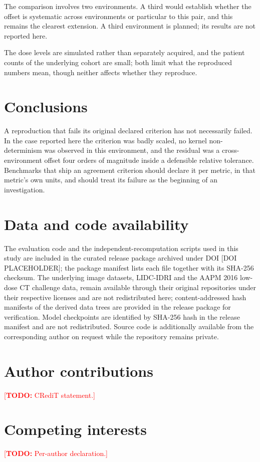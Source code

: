 \documentclass[11pt]{article}
\newcommand{\todo}[1]{\textcolor{red}{[\textbf{TODO:} #1]}}
\begin{document}
The comparison involves two environments. A third would establish whether the offset is systematic
across environments or particular to this pair, and this remains the clearest extension. A third
environment is planned; its results are not reported here.

The dose levels are simulated rather than separately acquired, and the patient counts of the
underlying cohort are small; both limit what the reproduced numbers mean, though neither affects
whether they reproduce.

\section{Conclusions}

A reproduction that fails its original declared criterion has not necessarily failed. In the case
reported here the criterion was badly scaled, no kernel non-determinism was observed in this
environment, and the residual was a cross-environment offset four orders of magnitude inside a
defensible relative tolerance. Benchmarks that ship an agreement criterion should declare it per metric, in that
metric's own units, and should treat its failure as the beginning of an investigation.

\section*{Data and code availability}
The evaluation code and the independent-recomputation scripts used in this study are
included in the curated release package archived under DOI [DOI PLACEHOLDER]; the package
manifest lists each file together with its SHA-256 checksum. The underlying image datasets,
LIDC-IDRI and the AAPM 2016 low-dose CT challenge data, remain available through their
original repositories under their respective licenses and are not redistributed here;
content-addressed hash manifests of the derived data trees are provided in the release
package for verification. Model checkpoints are identified by SHA-256 hash in the release
manifest and are not redistributed. Source code is additionally available from the
corresponding author on request while the repository remains private.

\section*{Author contributions}
\todo{CRediT statement.}

\section*{Competing interests}
\todo{Per-author declaration.}



\end{document}
